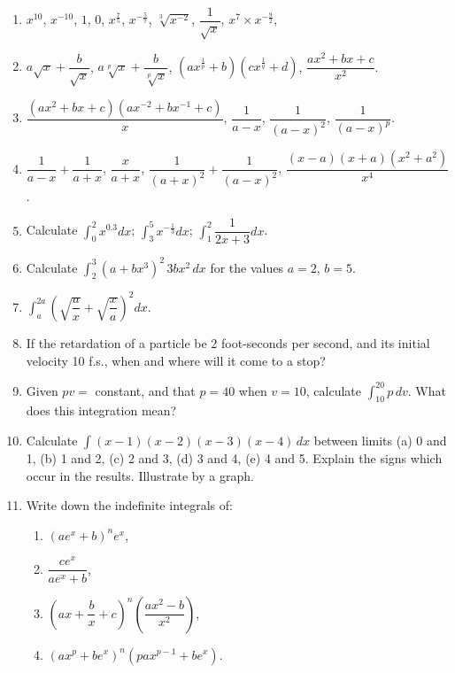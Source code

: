 \documentclass[11pt, a4paper]{article}
\begin{document}
\begin{enumerate}[leftmargin=2em]

\item $x^{10}$, $x^{-10}$, $1$, $0$, $x^{\frac{7}{5}}$, $x^{-\frac{5}{7}}$, $\sqrt[3]{x^{-2}}$, $\dfrac{1}{\sqrt{x}}$, $x^7 \times x^{-\frac{9}{2}}$,

\item $a\sqrt{x} + \dfrac{b}{\sqrt{x}}$, $a\sqrt[p]{x} + \dfrac{b}{\sqrt[p]{x}}$, $(ax^{\frac{1}{p}}+b)(cx^{\frac{1}{q}}+d)$, $\dfrac{ax^2+bx+c}{x^2}$.

\item $\dfrac{(ax^2+bx+c)(ax^{-2}+bx^{-1}+c)}{x}$, $\dfrac{1}{a-x}$, $\dfrac{1}{(a-x)^2}$, $\dfrac{1}{(a-x)^p}$.

\item $\dfrac{1}{a-x}+\dfrac{1}{a+x}$, $\dfrac{x}{a+x}$, $\dfrac{1}{(a+x)^2}+\dfrac{1}{(a-x)^2}$, $\dfrac{(x-a)(x+a)(x^2+a^2)}{x^4}$.

\item Calculate $\displaystyle\int_0^2 x^{0.3}dx$; $\displaystyle\int_3^5 x^{-\frac{1}{3}}dx$; $\displaystyle\int_1^2 \dfrac{1}{2x+3}dx$.

\item Calculate $\displaystyle\int_2^3 (a+bx^3)^2\, 3bx^2\, dx$ for the values $a=2$, $b=5$.

\item $\displaystyle\int_a^{2a} \left(\sqrt{\dfrac{a}{x}} + \sqrt{\dfrac{x}{a}}\right)^2 dx$.

\item If the retardation of a particle be 2 foot-seconds per second, and its initial velocity 10 f.s., when and where will it come to a stop?

\item Given $pv=$ constant, and that $p=40$ when $v=10$, calculate $\displaystyle\int_{10}^{20} p\, dv$. What does this integration mean?

\item Calculate $\displaystyle\int (x-1)(x-2)(x-3)(x-4)\, dx$ between limits (a) 0 and 1, (b) 1 and 2, (c) 2 and 3, (d) 3 and 4, (e) 4 and 5. Explain the signs which occur in the results. Illustrate by a graph.

\item Write down the indefinite integrals of:
\begin{enumerate}[label=(\roman*)]
\item $(ae^x+b)^n e^x$,
\item $\dfrac{ce^x}{ae^x+b}$,
\item $\left(ax+\dfrac{b}{x}+c\right)^n\left(\dfrac{ax^2-b}{x^2}\right)$,
\item $(ax^p+be^x)^n(pax^{p-1}+be^x)$.
\end{enumerate}


\end{enumerate}
\end{document}
